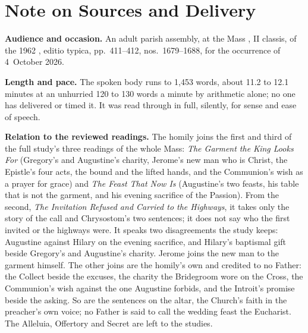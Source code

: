 
\section*{Note on Sources and Delivery}

{\footnotesize

\textbf{Audience and occasion.} An adult parish assembly, at the Mass
, II classis, of the 1962
, editio typica, pp.~411--412, nos.~1679--1688, for the
occurrence of 4~October 2026.

\textbf{Length and pace.} The spoken body runs to 1,453 words, about 11.2 to
12.1 minutes at an unhurried 120 to 130 words a minute by arithmetic alone; no
one has delivered or timed it. It was read through in full, silently, for sense
and ease of speech.

\textbf{Relation to the reviewed readings.} The homily joins the first and third
of the full study's three readings of the whole Mass: \textit{The Garment
the King Looks For} (Gregory's and Augustine's charity, Jerome's new man who is
Christ, the Epistle's four acts, the bound and the lifted hands, and the
Communion's wish as a prayer for grace) and \textit{The Feast That Now Is}
(Augustine's two feasts, his table that is not the garment, and his evening
sacrifice of the Passion). From the second, \textit{The Invitation Refused and
Carried to the Highways}, it takes only the story of the call and Chrysostom's
two sentences; it does not say who the first invited or the highways were. It
speaks two disagreements the study keeps: Augustine against Hilary on the
evening sacrifice, and Hilary's baptismal gift beside Gregory's and Augustine's
charity. Jerome joins the new man to the garment himself. The other joins are
the homily's own and credited to no Father: the Collect beside the excuses, the
charity the Bridegroom wore on the Cross, the Communion's wish against the one
Augustine forbids, and the Introit's promise beside the asking. So are the
sentences on the altar, the Church's faith in the preacher's own voice; no
Father is said to call the wedding feast the Eucharist. The Alleluia, Offertory
and Secret are left to the studies.

}
